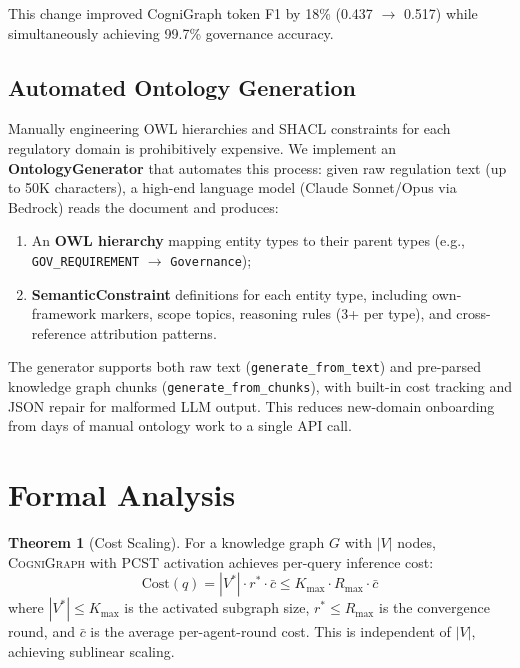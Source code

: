 \documentclass[a4paper,11pt]{article}
\theoremstyle{definition}
\newtheorem{theorem}{Theorem}[section]
\newcommand{\cogni}{\textsc{CogniGraph}}
\begin{document}
This change improved CogniGraph token F1 by 18\% (0.437 $\to$ 0.517) while simultaneously achieving 99.7\% governance accuracy.

\subsection{Automated Ontology Generation}
\label{sec:ontology_gen}

Manually engineering OWL hierarchies and SHACL constraints for each regulatory domain is prohibitively expensive. We implement an \textbf{OntologyGenerator} that automates this process: given raw regulation text (up to 50K characters), a high-end language model (Claude Sonnet/Opus via Bedrock) reads the document and produces:
\begin{enumerate}
\item An \textbf{OWL hierarchy} mapping entity types to their parent types (e.g., \texttt{GOV\_REQUIREMENT} $\to$ \texttt{Governance});
\item \textbf{SemanticConstraint} definitions for each entity type, including own-framework markers, scope topics, reasoning rules (3+ per type), and cross-reference attribution patterns.
\end{enumerate}
The generator supports both raw text (\texttt{generate\_from\_text}) and pre-parsed knowledge graph chunks (\texttt{generate\_from\_chunks}), with built-in cost tracking and JSON repair for malformed LLM output. This reduces new-domain onboarding from days of manual ontology work to a single API call.

\section{Formal Analysis}
\label{sec:formal}

\begin{theorem}[Cost Scaling]
\label{thm:cost}
For a knowledge graph $G$ with $|V|$ nodes, \cogni{} with PCST activation achieves per-query inference cost:
\[
\mathrm{Cost}(q) = |V^*| \cdot r^* \cdot \bar{c} \leq K_{\max} \cdot R_{\max} \cdot \bar{c}
\]
where $|V^*| \leq K_{\max}$ is the activated subgraph size, $r^* \leq R_{\max}$ is the convergence round, and $\bar{c}$ is the average per-agent-round cost.
This is independent of $|V|$, achieving sublinear scaling.
\end{theorem}
\end{document}

